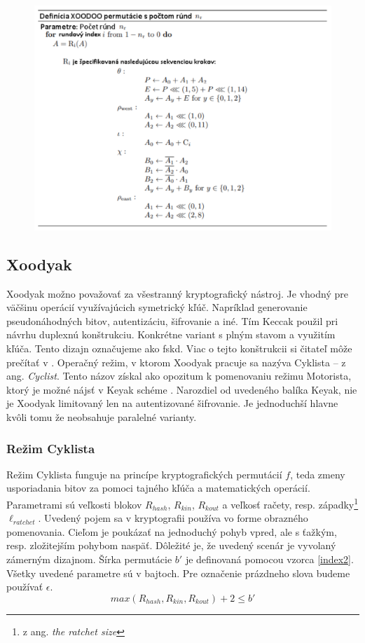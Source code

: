   \begin{figure}[!h]
  	\centering
  	\includegraphics[width=1.1\textwidth]{figures/xoodooalgo}
  	\caption{}
  	\label{xoodooalgo}
  \end{figure}

\subsection{Xoodyak} 
Xoodyak možno považovať za všestranný kryptografický nástroj. Je vhodný pre väčšinu operácií využívajúcich symetrický kľúč. Napríklad generovanie pseudonáhodných bitov, autentizáciu, šifrovanie a iné. Tím Keccak použil pri návrhu duplexnú konštrukciu. Konkrétne variant s plným stavom a využitím kľúča. Tento dizajn označujeme ako \acrfull{fskd}. Viac o tejto konštrukcii si čitateľ môže prečítať v \cite{duplex}.
Operačný režim, v ktorom Xoodyak pracuje sa nazýva Cyklista -- z ang. \textit{Cyclist}. Tento názov získal ako opozitum k pomenovaniu režimu Motorista, ktorý je možné nájsť v Keyak schéme \cite{keyak}. Narozdiel od uvedeného balíka Keyak, nie je Xoodyak limitovaný len na autentizované šifrovanie. Je jednoduchší hlavne kvôli tomu že neobsahuje paralelné varianty.

\subsubsection{Režim Cyklista}\label{cyklista}
Režim Cyklista funguje na princípe kryptografických permutácií $f$, teda zmeny usporiadania bitov za pomoci tajného kľúča a matematických operácií. Parametrami sú veľkosti blokov $R_{hash}$, $R_{kin}$, $R_{kout}$ a veľkosť račety, resp. západky\footnote{z ang. \textit{the ratchet size}} \cite{ratchet} $\ell_{ratchet}$. Uvedený pojem sa v kryptografii používa vo forme obrazného pomenovania. Cieľom je poukázať na jednoduchý pohyb vpred, ale s ťažkým, resp. zložitejším pohybom naspäť. Dôležité je, že uvedený scenár je vyvolaný zámerným dizajnom. Šírka permutácie $b'$ je definovaná pomocou vzorca \ref{index2}. Všetky uvedené parametre sú v bajtoch. Pre označenie prázdneho slova budeme používať $\epsilon$.
\begin{equation}\label{index2}
	max(R_{hash}, R_{kin}, R_{kout}) + 2 \leq b'
\end{equation} 

